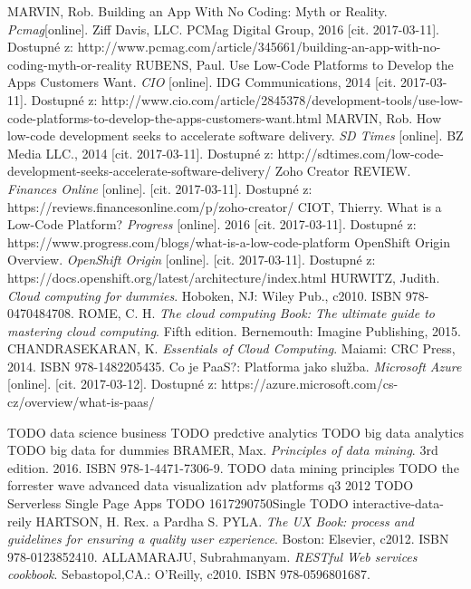 \begin{thebibliography}{99}

MARVIN, Rob. Building an App With No Coding: Myth or Reality.
\textit{Pcmag}[online].
 Ziff Davis, LLC. PCMag Digital Group, 2016 [cit. 2017-03-11]. Dostupné z: http://www.pcmag.com/article/345661/building-an-app-with-no-coding-myth-or-reality
RUBENS, Paul. Use Low-Code Platforms to Develop the Apps Customers Want.
\textit{CIO} [online].
IDG Communications, 2014 [cit. 2017-03-11]. Dostupné z: http://www.cio.com/article/2845378/development-tools/use-low-code-platforms-to-develop-the-apps-customers-want.html
MARVIN, Rob. How low-code development seeks to accelerate software delivery.
\textit{SD Times} [online].
BZ Media LLC., 2014 [cit. 2017-03-11]. Dostupné z: http://sdtimes.com/low-code-development-seeks-accelerate-software-delivery/
Zoho Creator REVIEW.
\textit{Finances Online} [online].
[cit. 2017-03-11]. Dostupné z: https://reviews.financesonline.com/p/zoho-creator/
CIOT, Thierry. What is a Low-Code Platform?
\textit{Progress} [online].
2016 [cit. 2017-03-11]. Dostupné z: https://www.progress.com/blogs/what-is-a-low-code-platform
OpenShift Origin Overview.
\textit{OpenShift Origin} [online].
[cit. 2017-03-11]. Dostupné z: https://docs.openshift.org/latest/architecture/index.html
HURWITZ, Judith.
\textit{Cloud computing for dummies}.
Hoboken, NJ: Wiley Pub., c2010. ISBN 978-0470484708.
ROME, C. H.
\textit{The cloud computing Book: The ultimate guide to mastering cloud computing}.
Fifth edition. Bernemouth: Imagine Publishing, 2015.
CHANDRASEKARAN, K.
\textit{Essentials of Cloud Computing}.
Maiami: CRC Press, 2014. ISBN 978-1482205435.
Co je PaaS?: Platforma jako služba.
\textit{Microsoft Azure} [online].
[cit. 2017-03-12]. Dostupné z: https://azure.microsoft.com/cs-cz/overview/what-is-paas/

TODO data science business
TODO predctive analytics
TODO big data analytics
TODO big data for dummies
BRAMER, Max.
\textit{Principles of data mining}.
3rd edition. 2016. ISBN 978-1-4471-7306-9.
TODO data mining principles
TODO the forrester wave advanced data visualization adv platforms q3 2012
TODO Serverless Single Page Apps
TODO 1617290750Single
TODO interactive-data-reily
HARTSON, H. Rex. a Pardha S. PYLA.
\textit{The UX Book: process and guidelines for ensuring a quality user experience}.
Boston: Elsevier, c2012. ISBN 978-0123852410.
ALLAMARAJU, Subrahmanyam.
\textit{RESTful Web services cookbook}.
Sebastopol,CA.: O'Reilly, c2010. ISBN 978-0596801687.


\end{thebibliography}
